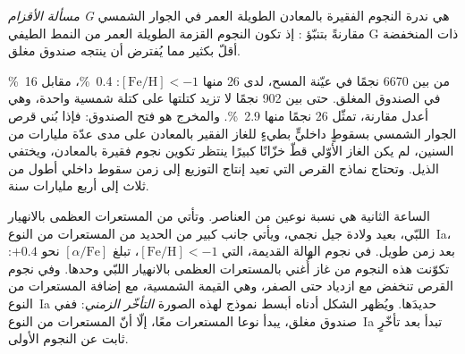\begin{definition}\label{def:b3:origin-of-elements:g-dwarf}
\emph{مسألة الأقزام G} هي ندرة
النجوم الفقيرة بالمعادن الطويلة العمر في الجوار الشمسي مقارنةً بتنبّؤ
: إذ تكون النجوم القزمة الطويلة العمر
من النمط الطيفي G ذات  المنخفضة أقلّ بكثير مما يُفترض أن ينتجه
صندوق مغلق.
\end{definition}

من بين 6670 نجمًا في عيّنة المسح، لدى 26 منها $[\mathrm{Fe/H}] < -1$:
\qty{0.4}{\percent}، مقابل \qty{16}{\percent} في الصندوق المغلق.
حتى بين 902 نجمًا لا تزيد كتلتها على كتلة شمسية واحدة، وهي أعدل
مقارنة، تمثّل 26 نجمًا منها \qty{2.9}{\percent}. والمخرج هو فتح
الصندوق: فإذا بُني قرص الجوار الشمسي بسقوطٍ داخليٍّ بطيءٍ
للغاز الفقير بالمعادن على مدى عدّة مليارات من السنين، لم يكن الغاز الأوّلي قطّ
خزّانًا كبيرًا ينتظر تكوين نجوم فقيرة بالمعادن، ويختفي
الذيل. وتحتاج نماذج القرص التي تعيد إنتاج التوزيع إلى
زمن سقوط داخلي أطول من ثلاث إلى أربع مليارات سنة.

الساعة الثانية هي نسبة نوعين من العناصر. وتأتي  من المستعرات العظمى بالانهيار اللبّي، بعيد ولادة جيل نجمي،
ويأتي جانب كبير من الحديد من المستعرات من النوع~Ia، بعد زمن طويل.
في نجوم الهالة القديمة، التي $[\mathrm{Fe/H}] < -1$،
تبلغ $[\alpha/\mathrm{Fe}]$ نحو $+0.4$: تكوّنت هذه النجوم من غاز
أُغني بالمستعرات العظمى بالانهيار اللبّي وحدها. وفي نجوم القرص تنخفض مع
ازدياد  حتى الصفر، وهي القيمة الشمسية، مع إضافة
المستعرات من النوع~Ia حديدَها. ويُظهر الشكل أدناه أبسط نموذج
لهذه الصورة \emph{التأخّر الزمني}: ففي صندوق مغلق، يبدأ نوعا
المستعرات معًا، إلّا أنّ المستعرات من النوع~Ia تبدأ بعد تأخّرٍ ثابت
عن النجوم الأولى.

